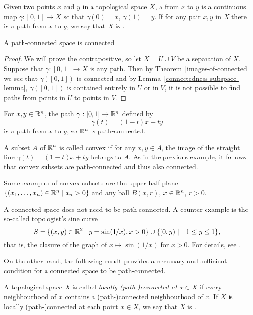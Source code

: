 \begin{defn}
  Given two points $x$ and $y$ in a topological space $X$, a  from $x$ to $y$ is a continuous map $\gamma : [0,1] \to X$ so that $\gamma(0) = x$, $\gamma(1) = y$. If for any pair $x,y$ in $X$ there is a path from $x$ to $y$, we say that $X$ is .
\end{defn}
\begin{prop}
  \label{path-connected-implies-connected}
  A path-connected space is connected.
\end{prop}
\begin{proof}
  We will prove the contrapositive, so let $X = U \cup V$ be a separation of $X$. Suppose that $\gamma : [0,1] \to X$ is any path. Then by Theorem~\ref{images-of-connected} we see that $\gamma([0,1])$ is connected and by Lemma~\ref{connectedness-subspace-lemma}, $\gamma([0,1])$ is contained entirely in $U$ or in $V$, it is not possible to find paths from points in $U$ to points in $V$.
\end{proof}
\begin{example}
  For $x, y \in \mathbb{R}^n$, the path $\gamma : [0,1] \to \mathbb{R}^n$ defined by
  \[
    \gamma(t) = (1-t)x + ty
  \]
  is a path from $x$ to $y$, so $\mathbb{R}^n$ is path-connected.
\end{example}
\begin{example}
  A subset $A$ of $\mathbb{R}^n$ is called convex if for any $x,y \in A$, the image of the straight line $\gamma(t) = (1-t)x + ty$ belongs to $A$. As in the previous example, it follows that convex subsets are path-connected and thus also connected.
  
  Some examples of convex subsets are the upper half-plane $\{(x_1,\dots,x_n) \in \mathbb{R}^n \mid x_n > 0\}$ and any ball $B(x,r)$, $x \in \mathbb{R}^n$, $r > 0$.
\end{example}
\begin{example}
  A connected space does not need to be path-connected. A counter-example is the so-called topologist's sine curve
  \[
    S = \{(x,y) \in \mathbb{R}^2 \mid y = \sin(1/x), x > 0 \} \cup \{(0,y) \mid -1 \leq y \leq 1 \},
  \]
  that is, the closure of the graph of $x \mapsto \sin(1/x)$ for $x > 0$. For details, see \cite[\S 24]{Mun}.
\end{example}
On the other hand, the following result provides a necessary and sufficient condition for a connected space to be path-connected.
\begin{defn}
  A topological space $X$ is called \emph{locally (path-)connected at $x \in X$} if every neighbourhood of $x$ contains a (path-)connected neighbourhood of $x$. If $X$ is locally (path-)connected at each point $x \in X$, we say that $X$ is .
\end{defn}
